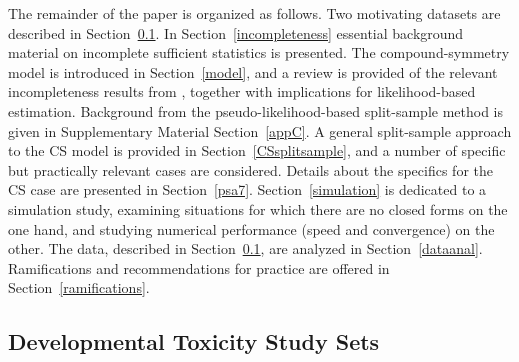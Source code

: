\documentclass[11pt,a5paper,twoside]{book}
\begin{document}
The remainder of the paper is organized as follows. Two motivating datasets are described in Section~\ref{ntpintro}.
In Section~\ref{incompleteness}
essential background material on incomplete sufficient statistics is presented. The compound-symmetry model is introduced in Section~\ref{model},
and a review is provided of the relevant incompleteness results from \cite{Lisa2015_2}, together with implications for likelihood-based estimation. Background from the pseudo-likelihood-based split-sample method is given in Supplementary Material Section~\ref{appC}.
A general split-sample approach to the CS model is provided in Section~\ref{CSsplitsample},
and a number of specific but practically relevant cases are considered.
Details about the specifics for the CS case are presented in Section~\ref{psa7}.
Section~\ref{simulation}
 is dedicated to a simulation study, examining situations for which there are no closed forms on the one hand, and studying numerical performance (speed and convergence) on the other. The data, described in Section~\ref{ntpintro},
are analyzed in Section~\ref{dataanal}.
Ramifications and recommendations for practice are offered in Section~\ref{ramifications}.

\subsection{Developmental Toxicity Study Sets}
\label{ntpintro}
\end{document}
